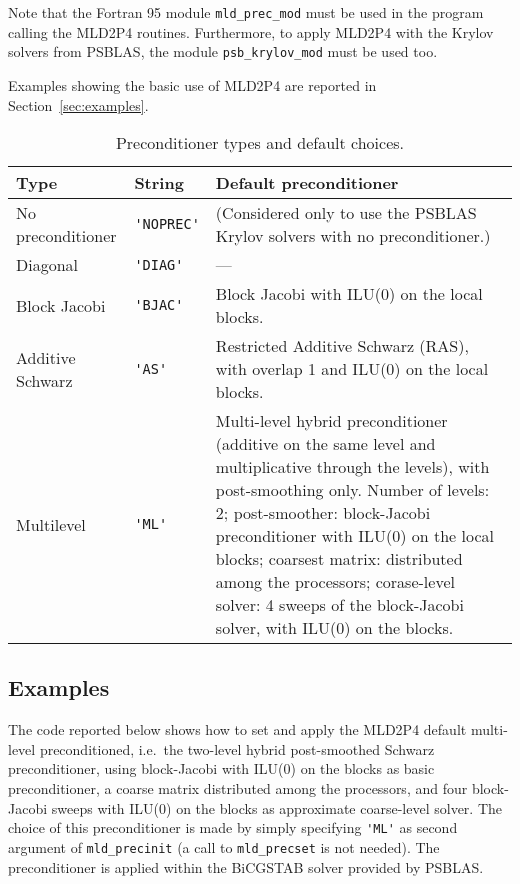 Note that the Fortran 95 module \verb|mld_prec_mod| must be used in the program
calling the MLD2P4 routines. Furthermore, to apply MLD2P4 with the Krylov solvers
from PSBLAS, the module \verb|psb_krylov_mod| must be used too.

Examples showing the basic use of MLD2P4 are reported in Section~\ref{sec:examples}.

\begin{table}[th]
{
\begin{center}
\begin{tabular}{|l|l|p{6.7cm}|}
\hline
Type              & String        & Default preconditioner \\ \hline
No preconditioner &\verb|'NOPREC'|& (Considered only to use the PSBLAS
                                    Krylov solvers with no preconditioner.) \\
Diagonal          & \verb|'DIAG'| & --- \\
Block Jacobi      & \verb|'BJAC'| & Block Jacobi with ILU(0) on the local blocks.\\ 
Additive Schwarz  & \verb|'AS'|   & Restricted Additive Schwarz (RAS),
                                    with overlap 1 and ILU(0) on the local blocks. \\ 
Multilevel        &\verb|'ML'|    & Multi-level hybrid preconditioner (additive on the
                                    same level and multiplicative through the levels),
                                    with post-smoothing only. Number of levels: 2;
                                    post-smoother: block-Jacobi preconditioner with ILU(0)
                                    on the local blocks; coarsest matrix: distributed among the
                                    processors; corase-level solver: 4 sweeps of the
                                    block-Jacobi solver, with ILU(0) on the blocks. \\
\hline
\end{tabular}
\end{center}
}
\caption{Preconditioner types and default choices.\label{tab:precinit}}
\end{table}

\subsection{Examples\label{sec:examples}}

The code reported below shows how to set and apply the MLD2P4 default multi-level
preconditioned, i.e.\ the two-level hybrid post-smoothed Schwarz preconditioner,
using block-Jacobi with ILU(0) on the blocks as basic preconditioner,
a coarse matrix distributed among the processors, and four block-Jacobi
sweeps with ILU(0) on the blocks as approximate coarse-level solver.
The choice of this preconditioner is made
by simply specifying \verb|'ML'| as second argument of \verb|mld_precinit|
(a call to \verb|mld_precset| is not needed).
The preconditioner is applied within the BiCGSTAB solver provided by PSBLAS. 

